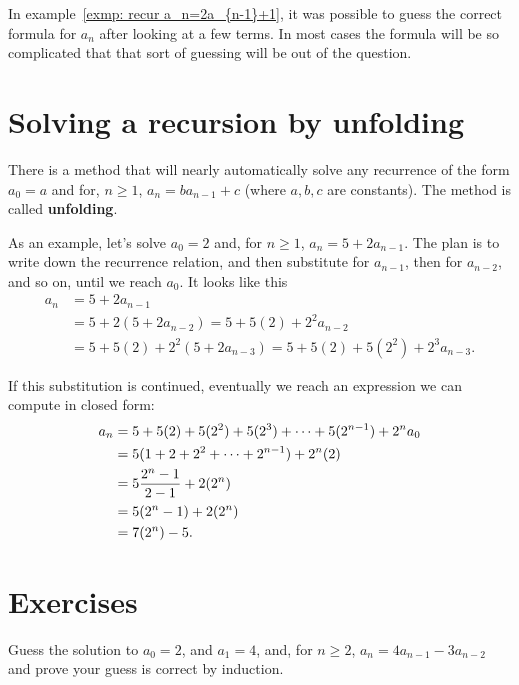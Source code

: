 In example~\ref{exmp: recur a_n=2a_{n-1}+1}, it was possible to guess the correct formula
for $a_n$ after looking at a few terms.  In most cases the formula will
be so complicated that that sort of guessing will be out of the
question. 


\section{Solving a recursion by unfolding}
There is a method that will nearly automatically solve any recurrence
of the form $a_0 = a$ and for, $n\geq 1$, $a_n= ba_{n-1}+c$ (where
$a,b,c$ are constants). The method is called {\bfseries unfolding}. 

\begin{exmp}
 As an example, let's solve $a_0=2$ and, for $n\geq 1$, $a_n=5+2a_{n-1}$.
 The plan is to write down the recurrence relation, and then substitute
 for $a_{n-1}$, then for $a_{n-2}$, and so on, until we reach $a_0$.
 It looks like this
 \begin{align*}
  a_n & = 5+2a_{n-1} \\
  & = 5+2(5+2a_{n-2}) = 5 + 5(2) + 2^2a_{n-2} \\
  & =  5 + 5(2) + 2^2(5+2a_{n-3})= 5+5(2)+5(2^2)+ 2^3a_{n-3}.
 \end{align*}
 
 
 If this substitution is continued, eventually we reach an expression we can compute in closed
 form: 
 \begin{align*}
  a_n & =  5+5(2)+5(2^2)+ 5(2^3) + \cdots +5(2^{n-1})+ 2^na_0 \\
  & = 5(1+2+2^2+\cdots+2^{n-1}) + 2^n(2) \\
  & = 5{{2^n-1}\over{2-1}} + 2(2^n) \\
  & =5(2^n-1) + 2(2^n) \\
  & = 7(2^n) -5.
 \end{align*}

\end{exmp}


\clearpage
\section{Exercises}

\begin{exer}
Guess the solution to $a_0=2$, and $a_1=4$, and, for $n\geq2$, $a_n = 4a_{n-1}-3a_{n-2}$
and prove your guess is correct by induction.
\end{exer}

